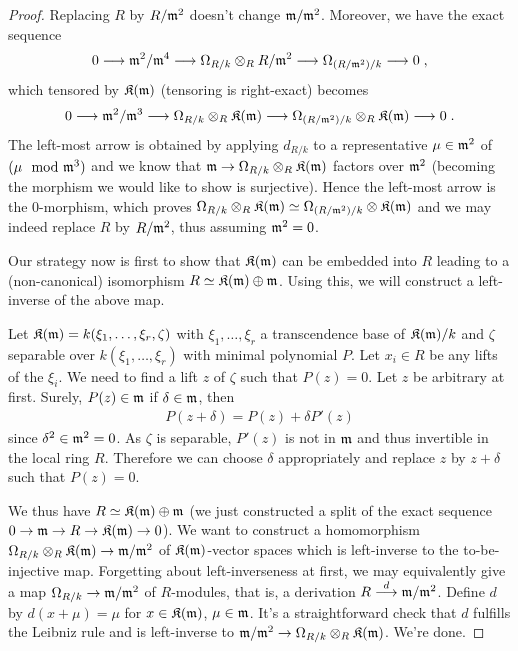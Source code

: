 \documentclass[a4paper,parskip=half,numbers=enddot, DIV=12]{scrreprt}
\begin{document}
\begin{proof}
	Replacing $R$ by $R/\mathfrak{m}^2$ doesn't change $\mathfrak{m}/\mathfrak{m}^2$. Moreover, we have the exact sequence
	\begin{align*}
		0\morphism \mm^2/\mm^4\morphism\Omega_{R/k}\otimes_R R/\mm^2\morphism\Omega_{(R/\mm^2)/k}\morphism 0\;,
	\end{align*}
	which tensored by $\mathfrak{K}(\mathfrak{m})$ (tensoring is right-exact) becomes
	\begin{align*}
		0\morphism \mm^2/\mm^3\morphism\Omega_{R/k}\otimes_R \KK(\mm)\morphism\Omega_{(R/\mm^2)/k}\otimes_R\KK(\mm)\morphism 0\;.
	\end{align*}
	The left-most arrow is obtained by applying $d_{R/k}$ to a representative $\mu\in\mathfrak{m}^2$ of $(\mu\mod{\mathfrak{m}}^3)$ and we know that $\mm\morphism\Omega_{R/k}\otimes_R\KK(\mm)$ factors over $\mathfrak{m}^2$ (becoming the morphism we would like to show is surjective). Hence the left-most arrow is the $0$-morphism, which proves $\Omega_{R/k}\otimes_R \mathfrak{K}(\mathfrak{m})\simeq\Omega_{(R/\mathfrak{m}^2)/k}\otimes\mathfrak{K}(\mathfrak{m})$ and we may indeed replace $R$ by $R/\mathfrak{m}^2$, thus assuming $\mathfrak{m}^2=0$.
	
	Our strategy now is first to show that $\mathfrak{K}(\mathfrak{m})$ can be embedded into $R$ leading to a (non-canonical) isomorphism $R\simeq\mathfrak{K}(\mathfrak{m})\oplus\mathfrak{m}$. Using this, we will construct a left-inverse of the above map.
	
	Let $\mathfrak{K}(\mathfrak{m})=k(\xi_1,\ldots,\xi_r,\zeta)$ with $\xi_1,\ldots,\xi_r$ a transcendence base of $\mathfrak{K}(\mathfrak{m})/k$ and $\zeta$ separable over $k(\xi_1,\ldots,\xi_r)$ with minimal polynomial $P$. Let $x_i\in R$ be any lifts of the $\xi_i$. We need to find a lift $z$ of $\zeta$ such that $P(z)=0$. Let $z$ be arbitrary at first. Surely, $P(z)\in\mathfrak{m}$ if $\delta\in\mathfrak{m}$, then
	\begin{align*}
		P(z+\delta)=P(z)+\delta P'(z)
	\end{align*}
	since $\delta^2\in\mathfrak{m}^2=0$. As $\zeta$ is separable, $P'(z)$ is not in $\mathfrak{m}$ and thus invertible in the local ring $R$. Therefore we can choose $\delta$ appropriately and replace $z$ by $z+\delta$ such that $P(z)=0$.
	
	We thus have $R\simeq \mathfrak{K}(\mathfrak{m})\oplus\mathfrak{m}$ (we just constructed a split of the exact sequence $0\morphism \mm\morphism R\morphism\KK(\mm)\morphism 0$). We want to construct a homomorphism $\Omega_{R/k}\otimes_R\KK(\mm)\morphism\mm/\mm^2$ of $\mathfrak{K}(\mathfrak{m})$-vector spaces which is left-inverse to the to-be-injective map. Forgetting about left-inverseness at first, we may equivalently give a map $\Omega_{R/k}\morphism\mm/\mm^2$ of $R$-modules, that is, a derivation $R\morphism[d]\mm/\mm^2$. Define $d$ by $d(x+\mu)=\mu$ for $x\in\mathfrak{K}(\mathfrak{m})$, $\mu\in\mathfrak{m}$. It's a straightforward check that $d$ fulfills the Leibniz rule and is left-inverse to $\mm/\mm^2\morphism\Omega_{R/k}\otimes_R\KK(\mm)$. We're done.
\end{proof}
\end{document}
